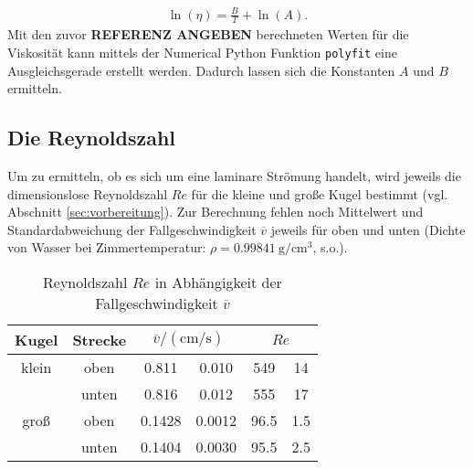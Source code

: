 \begin{align}
    \ln {\left( \eta \right)} = \frac{B}{T} + \ln{\left( A \right)}.
\end{align}
Mit den zuvor \textbf{REFERENZ ANGEBEN} berechneten Werten für die Viskosität kann mittels der Numerical Python Funktion \texttt{polyfit}
eine Ausgleichsgerade erstellt werden. Dadurch lassen sich die Konstanten $A$ und $B$ ermitteln.


\subsection[]{Die Reynoldszahl}
Um zu ermitteln, ob es sich um eine laminare Strömung handelt, wird jeweils die dimensionslose Reynoldszahl $Re$ für die kleine und große Kugel bestimmt
(vgl. Abschnitt \ref{sec:vorbereitung}).
Zur Berechnung fehlen noch Mittelwert und Standardabweichung der Fallgeschwindigkeit $\overline{v}$ jeweils für oben und unten
(Dichte von Wasser bei Zimmertemperatur: $\rho = \qty{0.99841}{\g \per \cm^3}$, s.o.).

\begin{table}
    \caption[]{Reynoldszahl $Re$ in Abhängigkeit der Fallgeschwindigkeit $\overline{v}$}
    \label{tab:reynold}
    \centering
    \begin{tabular}[]{S S S[table-format=1.4] @{${}\pm{}$} S[table-format=1.4] S[table-format=4.1] @{${}\pm{}$} S[table-format=3.1]}
        \toprule
        {Kugel} & {Strecke} &  &  \\
        \bottomrule
        {klein} & {oben} & 0.811 & 0.010 & 549 & 14 \\
         & {unten} & 0.816 & 0.012 & 555 & 17 \\
        {groß} & {oben} & 0.1428 & 0.0012 & 96.5 & 1.5 \\
         & {unten} & 0.1404 & 0.0030 & 95.5 & 2.5 \\
    \end{tabular}
\end{table}



